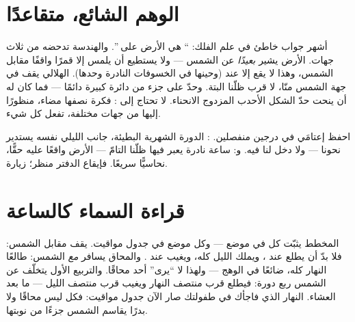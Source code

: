 \section{الوهم الشائع، متقاعدًا}

\begin{proposition}\label{prop:g7:moon-phases:notshadow}
أشهر جواب خاطئ في علم الفلك: `` هي  الأرض على
''. والهندسة تدحضه من ثلاث جهات.  الأرض يشير
\emph{بعيدًا} عن الشمس --- ولا يستطيع أن يلمس إلا قمرًا واقفًا
مقابل الشمس، وهذا لا يقع إلا عند  (وحينها في الخسوفات
النادرة وحدها).  الهلالي يقف في جهة الشمس منّا، لا قرب
ظلّنا البتة. وحدّ  على  جزء من دائرة كبيرة دائمًا ---
فما كان له أن ينحت حدّ الشكل الأحدب المزدوج الانحناء. 
لا تحتاج إلى : فكرة نصفها مضاء، منظورًا إليها من جهات
مختلفة، تفعل كل شيء.
\end{proposition}

\begin{example}\label{ex:g7:moon-phases:eclipsevs}
احفظ إعتامَي  في درجين منفصلين. \emph{}: الدورة
الشهرية البطيئة، جانب  الليلي نفسه يستدير نحونا --- ولا
دخل  لنا فيه. و\emph{}: ساعة نادرة يعبر فيها 
ظلّنا التامّ ---  الأرض واقعًا عليه حقًّا، نحاسيًّا سريعًا.
فإيقاع الدفتر منظر؛  زيارة.
\end{example}

\section{قراءة السماء كالساعة}

\begin{example}\label{ex:g7:moon-phases:hours}
المخطط يثبّت كل  في موضع --- وكل موضع في جدول مواقيت. 
يقف مقابل الشمس: فلا بدّ أن يطلع عند ، ويملك الليل كله،
ويغيب عند . والمحاق يسافر \emph{مع} الشمس: طالعًا النهار
كله، ضائعًا في الوهج --- ولهذا لا ``يرى'' أحد محاقًا. والتربيع
الأول يتخلّف عن الشمس ربع دورة: فيطلع قرب منتصف النهار ويغيب
قرب منتصف الليل ---  ما بعد العشاء.  النهار الذي فاجأك
في طفولتك صار الآن جدول مواقيت: فكل  ليس محاقًا ولا بدرًا
يقاسم الشمس جزءًا من نوبتها.
\end{example}


